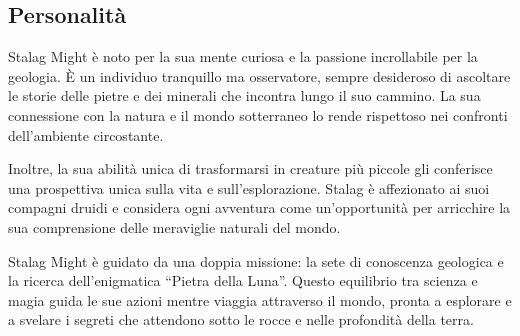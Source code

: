 \subsection{Personalità}\label{personalituxe0}


Stalag Might è noto per la sua mente curiosa e la passione incrollabile
per la geologia. È un individuo tranquillo ma osservatore, sempre
desideroso di ascoltare le storie delle pietre e dei minerali che
incontra lungo il suo cammino. La sua connessione con la natura e il
mondo sotterraneo lo rende rispettoso nei confronti dell'ambiente
circostante.

Inoltre, la sua abilità unica di trasformarsi in creature più piccole
gli conferisce una prospettiva unica sulla vita e sull'esplorazione.
Stalag è affezionato ai suoi compagni druidi e considera ogni avventura
come un'opportunità per arricchire la sua comprensione delle meraviglie
naturali del mondo.

Stalag Might è guidato da una doppia missione: la sete di conoscenza
geologica e la ricerca dell'enigmatica ``Pietra della Luna''. Questo
equilibrio tra scienza e magia guida le sue azioni mentre viaggia
attraverso il mondo, pronta a esplorare e a svelare i segreti che
attendono sotto le rocce e nelle profondità della terra.

